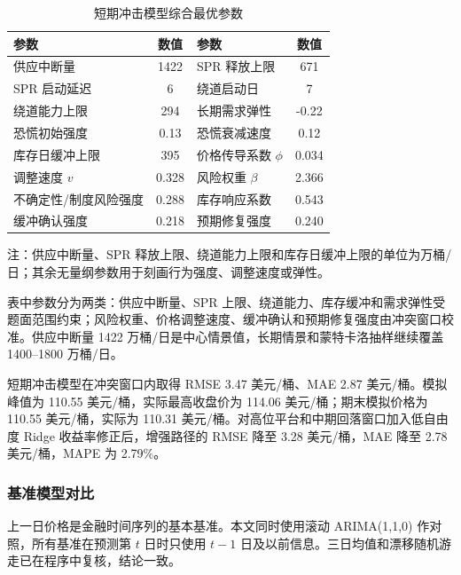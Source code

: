 \begin{table}[!htbp]
\centering
\caption{短期冲击模型综合最优参数}
\begin{threeparttable}
\begin{tabular}{l S[table-format=4.3] l S[table-format=3.3]}
\toprule
参数 & {数值} & 参数 & {数值} \\
\midrule
供应中断量 & 1422 & SPR 释放上限 & 671 \\
SPR 启动延迟 & 6 & 绕道启动日 & 7 \\
绕道能力上限 & 294 & 长期需求弹性 & -0.22 \\
恐慌初始强度 & 0.13 & 恐慌衰减速度 & 0.12 \\
库存日缓冲上限 & 395 & 价格传导系数 $\phi$ & 0.034 \\
调整速度 $v$ & 0.328 & 风险权重 $\beta$ & 2.366 \\
不确定性/制度风险强度 & 0.288 & 库存响应系数 & 0.543 \\
缓冲确认强度 & 0.218 & 预期修复强度 & 0.240 \\
\bottomrule
\end{tabular}
\begin{tablenotes}
\footnotesize
\item 注：供应中断量、SPR 释放上限、绕道能力上限和库存日缓冲上限的单位为万桶/日；其余无量纲参数用于刻画行为强度、调整速度或弹性。
\end{tablenotes}
\end{threeparttable}
\end{table}

表中参数分为两类：供应中断量、SPR 上限、绕道能力、库存缓冲和需求弹性受题面范围约束；风险权重、价格调整速度、缓冲确认和预期修复强度由冲突窗口校准。供应中断量 1422 万桶/日是中心情景值，长期情景和蒙特卡洛抽样继续覆盖 1400--1800 万桶/日。

短期冲击模型在冲突窗口内取得 RMSE 3.47 美元/桶、MAE 2.87 美元/桶。模拟峰值为 110.55 美元/桶，实际最高收盘价为 114.06 美元/桶；期末模拟价格为 110.55 美元/桶，实际为 110.31 美元/桶。对高位平台和中期回落窗口加入低自由度 Ridge 收益率修正后，增强路径的 RMSE 降至 3.28 美元/桶，MAE 降至 2.78 美元/桶，MAPE 为 2.79\%。


\subsubsection{基准模型对比}

上一日价格是金融时间序列的基本基准。本文同时使用滚动 ARIMA(1,1,0) 作对照，所有基准在预测第 \(t\) 日时只使用 \(t-1\) 日及以前信息。三日均值和漂移随机游走已在程序中复核，结论一致。

